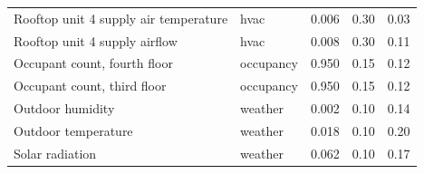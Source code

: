 \begin{table}[!htbp]
\begin{tabular}{@{}l l ccc@{}}
Rooftop unit 4 supply air temperature & hvac & 0.006 & 0.30 & 0.03 \\
Rooftop unit 4 supply airflow & hvac & 0.008 & 0.30 & 0.11 \\
Occupant count, fourth floor & occupancy & 0.950 & 0.15 & 0.12 \\
Occupant count, third floor & occupancy & 0.950 & 0.15 & 0.12 \\
Outdoor humidity & weather & 0.002 & 0.10 & 0.14 \\
Outdoor temperature & weather & 0.018 & 0.10 & 0.20 \\
Solar radiation & weather & 0.062 & 0.10 & 0.17 \\
\bottomrule
\end{tabular}
\end{table}
